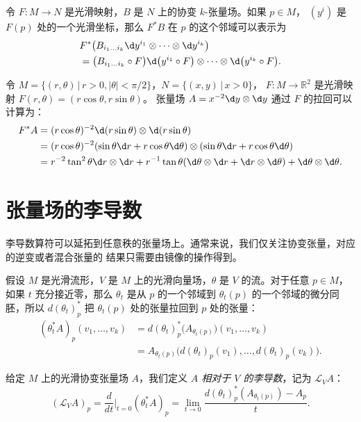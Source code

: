 \begin{corollary}
  令 $F:M\to N$ 是光滑映射，$B$ 是 $N$ 上的协变 $k$-张量场。如果 $p\in M$，
  $(y^i)$ 是 $F(p)$ 处的一个光滑坐标，那么 $F^*B$ 在 $p$ 的这个邻域可以表示为
  \begin{align*}
    &F^*\bigl(B_{i_1\dots i_k}\d y^{i_1}\otimes\cdots\otimes \d y^{i_k}\bigr)\\
    &=\bigl(B_{i_1\dots i_k}\circ F\bigr)
    \d\bigl(y^{i_1}\circ F\bigr)\otimes\cdots\otimes
    \d\bigl(y^{i_k}\circ F\bigr).
  \end{align*}
\end{corollary}

\begin{example}
  令 $M=\{(r,\theta)\,|\, r>0,|\theta|<\pi/2\}$，$N=\{(x,y)\,|\, x>0\}$，
  $F:M\to \mathbb{R}^2$ 是光滑映射 $F(r,\theta)=(r\cos\theta,r\sin\theta)$。
  张量场 $A=x^{-2}\d y\otimes\d y$ 通过 $F$ 的拉回可以计算为：
  \begin{align*}
    F^*A&=(r\cos\theta)^{-2}\d(r\sin\theta)\otimes\d (r\sin\theta)\\
    &=(r\cos\theta)^{-2}(\sin\theta\d r+r\cos\theta\d\theta)
    \otimes (\sin\theta\d r+r\cos\theta\d\theta)\\
    &=r^{-2}\tan^2\theta\d r\otimes\d r+
    r^{-1}\tan\theta(\d\theta\otimes\d r+\d r\otimes\d \theta)
    +\d\theta\otimes\d\theta.
  \end{align*}
\end{example}

\section{张量场的李导数}

李导数算符可以延拓到任意秩的张量场上。通常来说，我们仅关注协变张量，对应的逆变或者混合张量的
结果只需要由镜像的操作得到。

假设 $M$ 是光滑流形，$V$ 是 $M$ 上的光滑向量场，$\theta$ 是 $V$ 的流。对于任意 $p\in M$，如果
$t$ 充分接近零，那么 $\theta_t$ 是从 $p$ 的一个邻域到 $\theta_t(p)$ 的一个邻域的微分同胚，所以
$d(\theta_t)_p^*$ 把 $\theta_t(p)$ 处的张量拉回到 $p$ 处的张量：
\begin{align*}
  (\theta_t^*A)_p(v_1,\dots,v_k)&=  d(\theta_t)_p^*\bigl(A_{\theta_t(p)}\bigr)(v_1,\dots,v_k)\\
  &=A_{\theta_t(p)}\bigl(
    d(\theta_t)_p(v_1),\dots,d(\theta_t)_p(v_k)
  \bigr).
\end{align*}

给定 $M$ 上的光滑协变张量场 $A$，我们定义 \emph{$A$ 相对于 $V$ 的李导数}，记为 $\mathcal L_VA$：
\begin{equation}
  (\mathcal L_VA)_p=\frac{d}{dt}\bigg|_{t=0}(\theta_t^*A)_p=\lim_{t\to 0}
  \frac{d(\theta_t)_p^*(A_{\theta_t(p)})-A_p}{t}.
\end{equation}

